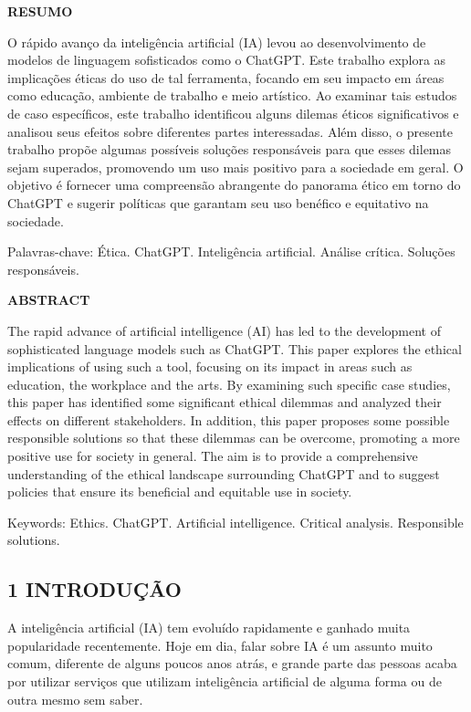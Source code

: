 \textbf{RESUMO}

O rápido avanço da inteligência artificial (IA) levou ao desenvolvimento de modelos de linguagem sofisticados como o ChatGPT. Este trabalho explora as implicações éticas do uso de tal ferramenta, focando em seu impacto em áreas como educação, ambiente de trabalho e meio artístico. Ao examinar tais estudos de caso específicos, este trabalho identificou alguns dilemas éticos significativos e analisou seus efeitos sobre diferentes partes interessadas. Além disso, o presente trabalho propõe algumas possíveis soluções responsáveis para que esses dilemas sejam superados, promovendo um uso mais positivo para a sociedade em geral. O objetivo é fornecer uma compreensão abrangente do panorama ético em torno do ChatGPT e sugerir políticas que garantam seu uso benéfico e equitativo na sociedade.

Palavras-chave: Ética. ChatGPT. Inteligência artificial. Análise crítica. Soluções responsáveis.


\textbf{ABSTRACT}

The rapid advance of artificial intelligence (AI) has led to the development of sophisticated language models such as ChatGPT. This paper explores the ethical implications of using such a tool, focusing on its impact in areas such as education, the workplace and the arts. By examining such specific case studies, this paper has identified some significant ethical dilemmas and analyzed their effects on different stakeholders. In addition, this paper proposes some possible responsible solutions so that these dilemmas can be overcome, promoting a more positive use for society in general. The aim is to provide a comprehensive understanding of the ethical landscape surrounding ChatGPT and to suggest policies that ensure its beneficial and equitable use in society.


Keywords: Ethics. ChatGPT. Artificial intelligence. Critical analysis. Responsible solutions.


\subsection*{\textbf{1 INTRODUÇÃO}}
A inteligência artificial (IA) tem evoluído rapidamente e ganhado muita popularidade recentemente. Hoje em dia, falar sobre IA é um assunto muito comum, diferente de alguns poucos anos atrás, e grande parte das pessoas acaba por utilizar serviços que utilizam inteligência artificial de alguma forma ou de outra mesmo sem saber.

